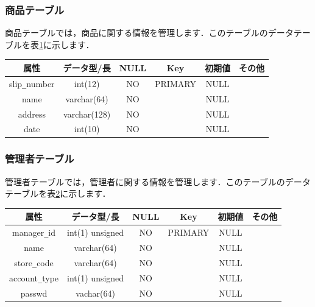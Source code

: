 \documentclass[a4j,titlepage]{jarticle}
\begin{document}
\subsubsection{商品テーブル}
商品テーブルでは，商品に関する情報を管理します．このテーブルのデータテーブルを表\ref{goodsTable}に示します．
\begin{table}[htb]
  \label{goodsTable}
  \begin{center}
    \begin{tabular}{|c|c|c|c|c|c|} \hline
      属性 & データ型/長 & NULL & Key & 初期値 & その他 \\ \hline \hline
      slip\verb|_|number & int(12) & NO & PRIMARY  & NULL & \\ \hline
      name & varchar(64) & NO &   & NULL & \\ \hline
      address & varchar(128) & NO &   & NULL & \\ \hline
      date & int(10) & NO &   & NULL & \\ \hline
    \end{tabular}
  \end{center}
\end{table}

\subsubsection{管理者テーブル}
管理者テーブルでは，管理者に関する情報を管理します．このテーブルのデータテーブルを表\ref{managerTable}に示します．
\begin{table}[htb]
  \label{managerTable}
  \begin{center}
    \begin{tabular}{|c|c|c|c|c|c|} \hline
      属性 & データ型/長 & NULL & Key & 初期値 & その他 \\ \hline \hline
      manager\verb|_|id & int(1) unsigned & NO & PRIMARY & NULL & \\ \hline
      name & varchar(64) & NO &   & NULL & \\ \hline
      store\verb|_|code & varchar(64) & NO &   & NULL & \\ \hline
      account\verb|_|type & int(1) unsigned & NO &   & NULL & \\ \hline
      passwd & vachar(64) & NO &   & NULL & \\ \hline
    \end{tabular}
  \end{center}
\end{table}
\end{document}
